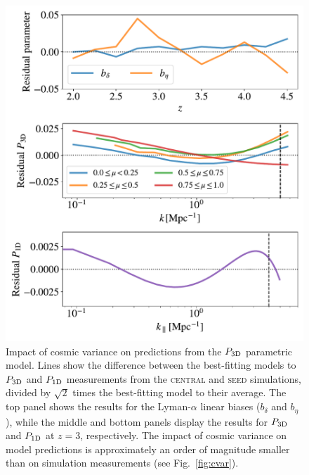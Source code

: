 \documentclass[longauth]{aa}
\newcommand{\lya}{Lyman-$\alpha$\xspace}
\newcommand{\poned}{\ensuremath{P_{\rm 1D}}\xspace}
\newcommand{\pthreed}{\ensuremath{P_{\rm 3D}}\xspace}
\newcommand{\simseed}{\textsc{seed}\xspace}
\newcommand{\simcentral}{\textsc{central}\xspace}
\begin{document}
\begin{appendix}
\begin{figure}
\includegraphics[width=\columnwidth]{figures/cvar_fit_z_3.0.pdf}
\centering
\caption{Impact of cosmic variance on predictions from the \pthreed parametric model. Lines show the difference between the best-fitting models to \pthreed and \poned measurements from the \simcentral and \simseed simulations, divided by $\sqrt{2}$ times the best-fitting model to their average. The top panel shows the results for the \lya linear biases ($b_\delta$ and $b_\eta$), while the middle and bottom panels display the results for \pthreed and \poned at $z=3$, respectively. The impact of cosmic variance on model predictions is approximately an order of magnitude smaller than on simulation measurements (see Fig.~\ref{fig:cvar}).}
\label{fig:cvar_fit}
\end{figure}


\end{appendix}
\end{document}
